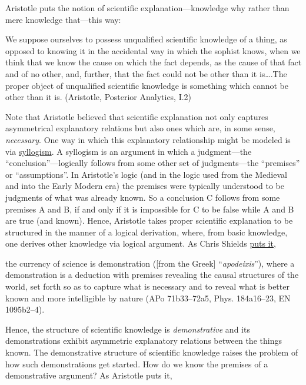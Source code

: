 \documentclass[12pt]{article}
\begin{document}
Aristotle puts the notion of scientific explanation---knowledge why
rather than mere knowledge that---this way:

\begin{quote-b}
We suppose ourselves to possess unqualified scientific knowledge of a thing, as
opposed to knowing it in the accidental way in which the sophist knows, when we
think that we know the cause on which the fact depends, as the cause of that fact
and of no other, and, further, that the fact could not be other than it is\ldots{}.The
proper object of unqualified scientific knowledge is something which cannot be
other than it is. (Aristotle, Posterior Analytics, I.2)
\end{quote-b}

Note that Aristotle believed that scientific explanation not only captures
asymmetrical explanatory relations but also ones which are, in some sense, \emph{necessary}.
One way in which this explanatory relationship might be modeled is via \href{http://plato.stanford.edu/entries/aristotle-logic/}{syllogism}. A
syllogism is an argument in which a judgment---the ``conclusion''---logically follows
from some other set of judgments---the ``premises'' or ``assumptions''. In Aristotle's
logic (and in the logic used from the Medieval and into the Early Modern era) the
premises were typically understood to be judgments of what was already known. So a
conclusion C follows from some premises A and B, if and only if it is impossible for
C to be false while A and B are true (and known). Hence, Aristotle takes proper
scientific explanation to be structured in the manner of a logical derivation, where,
from basic knowledge, one derives other knowledge via logical argument. As Chris
Shields \href{http://plato.stanford.edu/entries/aristotle/\#Sci}{puts it,}

\begin{quote-b}
the currency of science is demonstration ([from the Greek] ``\emph{apodeixis}''), where a
demonstration is a deduction with premises revealing the causal structures of the
world, set forth so as to capture what is necessary and to reveal what is better
known and more intelligible by nature (APo 71b33--72a5, Phys. 184a16--23, EN
1095b2--4).
\end{quote-b}

Hence, the structure of scientific knowledge is \emph{demonstrative} and its demonstrations
exhibit asymmetric explanatory relations between the things known. The demonstrative
structure of scientific knowledge raises the problem of how such demonstrations get
started. How do we know the premises of a demonstrative argument? As Aristotle puts
it,
\end{document}
